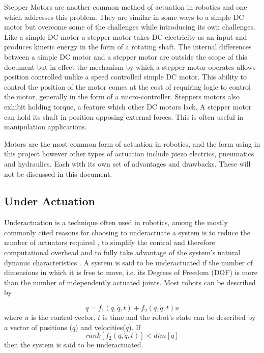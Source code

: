 Stepper Motors are another common method of actuation in robotics and one which addresses this problem. They are similar in some ways to a simple DC motor but overcome some of the challenges while introducing its own challenges. Like a simple DC motor a stepper motor takes DC electricity as an input and produces kinetic energy in the form of a rotating shaft. The internal differences between a simple DC motor and a stepper motor are outside the scope of this document but in effect the mechanism by which a stepper motor operates allows position controlled unlike a speed controlled simple DC motor. This ability to control the position of the motor comes at the cost of requiring logic to control the motor, generally in the form of a micro-controller. Steppers motors also exhibit holding torque, a feature which other DC motors lack. A stepper motor can hold its shaft in position opposing external forces. This is often useful in manipulation applications.

Motors are the most common form of actuation in robotics, and the form using in this project however other types of actuation include piezo electrics, pneumatics and hydraulics. Each with its own set of advantages and drawbacks. These will not be discussed in this document.

\subsection{Under Actuation}\label{UnderActuaction}

Underactuation is a technique often used in robotics, among the mostly commonly cited reasons for choosing to underactuate a system is to reduce the number of actuators required \cite{UnderactuationReductionInActuactors}, to simplify the control and therefore computational overhead and to fully take advantage of the system's natural dynamic characteristics \cite{PassiveDynamicWalker}. A system is said to be underactuated if the number of dimensions in which it is free to move, i.e. its Degrees of Freedom (DOF) is more than the number of independently actuated joints. Most robots can be described by 

\begin{equation}
\ddot{q} = f_1(q,\dot{q},t) + f_2(q, \dot{q},t)u   
\end{equation}
where \(u\) is the control vector, \(t\) is time and the robot's state can be described by a vector of positions (\(q\)) and velocities(\(\dot{q}\)). If 
\begin{equation}
    rank[f_2(q,\dot{q},t)] < dim[q]
\end{equation}
then the system is said to be underactuated.

